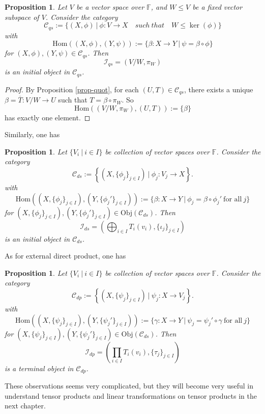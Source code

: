 \documentclass[12pt]{amsbook}
\newtheorem{proposition}[theorem]{Proposition}
\begin{document}
\begin{proposition}
    Let $V$ be a vector space over $\mathbb{F}$, and $W \leq V$ be a fixed vector subspace of $V$. Consider the category
    $$\mathcal{C}_{qs} := \{(X,\phi)\ |\ \phi:V \to X \quad such\ that\quad W \leq \ker(\phi)\}$$
    with 
    $$\mathrm{Hom}((X,\phi),(Y,\psi)) := \{\beta:X \to Y\ |\ \psi = \beta \circ \phi\}$$ 
    for $(X,\phi),(Y,\psi) \in \mathcal{C}_{qs}$. Then
    $$\mathcal{I}_{qs} = (V/W,\pi_W)$$
    is an initial object in $\mathcal{C}_{qs}$.
 \end{proposition}
\begin{proof}
    By Proposition \ref{prop-quot}, for each $(U,T) \in \mathcal{C}_{qs}$, there exists a unique $\beta = \overline{T}: V/W \to U$ such that $T = \beta \circ \pi_W$. So  
    $$\mathrm{Hom}((V/W,\pi_W),(U,T)) := \{\beta\}$$ 
    has exactly one element.
\end{proof}
Similarly, one has
\begin{proposition}
    Let $\{V_i\ |\ i \in I\}$ be collection of vector spaces over $\mathbb{F}$. Consider the category
    $$\mathcal{C}_{ds} := \left\{(X, \{\phi_j\}_{j \in I})\ |\ \phi_j : V_j \to X \right\}.$$
    with
$$\mathrm{Hom}((X,\{\phi_j\}_{j \in I}),(Y,\{\phi_j'\}_{j \in I})) := \{\beta:X \to Y\ |\ \phi_j = \beta \circ \phi_j'\ \text{for all}\ j\}$$ 
for $(X,\{\phi_j\}_{j \in I}), (Y,\{\phi_j'\}_{j \in I}) \in \mathrm{Obj}(\mathcal{C}_{ds})$. Then 
$$\mathcal{I}_{ds} = \left(\bigoplus_{i \in I} T_i(v_i), \{\iota_j\}_{j \in I}\right)$$ 
is an initial object in $\mathcal{C}_{ds}$.
\end{proposition}
As for external direct product, one has
\begin{proposition}
    Let $\{V_i\ |\ i \in I\}$ be collection of vector spaces over $\mathbb{F}$. Consider the category
    $$\mathcal{C}_{dp} := \left\{(X, \{\psi_j\}_{j \in I})\ |\ \psi_j : X \to V_j \right\}.$$
    with 
$$\mathrm{Hom}((X,\{\psi_j\}_{j \in I}),(Y,\{\psi_j'\}_{j \in I})) := \{\gamma:X \to Y\ |\ \psi_j = \psi_j' \circ \gamma\ \text{for all}\ j\}$$ 
 for $(X,\{\psi_j\}_{j \in I}), (Y,\{\psi_j'\}_{j \in I}) \in \mathrm{Obj}(\mathcal{C}_{ds})$. Then 
$$\mathcal{I}_{dp} = \left(\prod_{i \in I} T_i(v_i), \{\tau_j\}_{j \in I}\right)$$ 
is a terminal object in $\mathcal{C}_{dp}$.
\end{proposition}
These observations seems very complicated, but they will become very useful in understand tensor products and linear transformations on tensor products in the next chapter.
\end{document}
